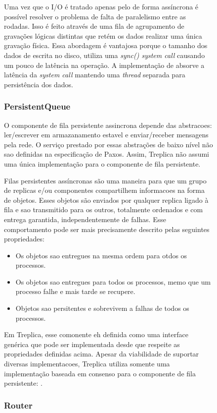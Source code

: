 \begin{figure}[ht]
Uma vez que o I/O é tratado apenas pelo  de forma assíncrona é
possível resolver o problema de falta de paralelismo entre as rodadas. Isso é feito
através de uma fila de agrupamento de gravações lógicas distintas que retém os dados
realizar uma única gravação física. Essa abordagem é vantajosa porque o tamanho dos dados
de escrita no disco, utiliza uma \emph{sync() system call} causando um pouco de latência
na operação. A implementação de  absorve a latência da \emph{system
call} mantendo uma \emph{thread} separada para persistência dos dados.

\subsubsection{PersistentQueue}

O componente de fila persistente assincrona depende das abstracoes: ler/escrever em
armazanamento estavel e enviar/receber mensagens pela rede. O serviço prestado por essas
abstrações de baixo nível não sao definidas na especificação de Paxos. Assim, Treplica não
assumi uma única implementação para o componente de fila persistente.

Filas persistentes assíncronas são uma maneira para que um grupo de replicas e/ou
componentes compartilhem informacoes na forma de objetos. Esses objetos são enviados por
qualquer replica ligado à fila e sao transmitido para os outros, totalmente ordenados e
com entrega garantida, independentemente de falhas. Esse comportamento pode ser mais
precisamente descrito pelas seguintes propriedades:

\begin{itemize}
  \item Os objetos sao entregues na mesma ordem para otdos os processos.
  \item Os objetos sao entregues para todos os processos, memo que um processo falhe e
    mais tarde se recupere.
  \item Objetos sao persitentes e sobrevivem a falhas de todos os processos.  
\end{itemize}

Em Treplica, esse comonente eh definida como uma interface genérica que pode ser
implementada desde que respeite as propriedades definidas acima. Apesar da viabilidade de
suportar diversas implementacoes, Treplica utiliza somente uma implementação baseada em
consenso para o componente de fila persistente: .

\subsubsection{Router}


\end{figure}
